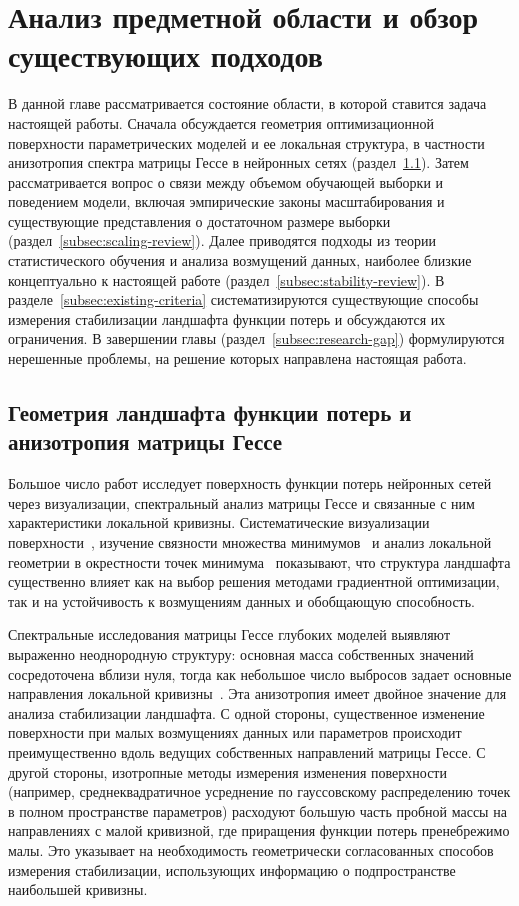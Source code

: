 \section{Анализ предметной области и обзор существующих подходов}\label{sec1}

В данной главе рассматривается состояние области, в которой ставится задача настоящей работы. Сначала обсуждается геометрия оптимизационной поверхности параметрических моделей и ее локальная структура, в частности анизотропия спектра матрицы Гессе в нейронных сетях (раздел~\ref{subsec:landscape-review}). Затем рассматривается вопрос о связи между объемом обучающей выборки и поведением модели, включая эмпирические законы масштабирования и существующие представления о достаточном размере выборки (раздел~\ref{subsec:scaling-review}). Далее приводятся подходы из теории статистического обучения и анализа возмущений данных, наиболее близкие концептуально к настоящей работе (раздел~\ref{subsec:stability-review}). В разделе~\ref{subsec:existing-criteria} систематизируются существующие способы измерения стабилизации ландшафта функции потерь и обсуждаются их ограничения. В завершении главы (раздел~\ref{subsec:research-gap}) формулируются нерешенные проблемы, на решение которых направлена настоящая работа.

\subsection{Геометрия ландшафта функции потерь и анизотропия матрицы Гессе}\label{subsec:landscape-review}

Большое число работ исследует поверхность функции потерь нейронных сетей через визуализации, спектральный анализ матрицы Гессе и связанные с ним характеристики локальной кривизны. Систематические визуализации поверхности~\cite{li2018visualizing}, изучение связности множества минимумов~\cite{draxler2018essentially,garipov2018loss} и анализ локальной геометрии в окрестности точек минимума~\cite{fort2019large} показывают, что структура ландшафта существенно влияет как на выбор решения методами градиентной оптимизации, так и на устойчивость к возмущениям данных и обобщающую способность.

Спектральные исследования матрицы Гессе глубоких моделей выявляют выраженно неоднородную структуру: основная масса собственных значений сосредоточена вблизи нуля, тогда как небольшое число выбросов задает основные направления локальной кривизны~\cite{sagun2017hessian,ghorbani2019investigation,papyan2019measurements,papyan2020traces,singh2021analytic}. Эта анизотропия имеет двойное значение для анализа стабилизации ландшафта. С одной стороны, существенное изменение поверхности при малых возмущениях данных или параметров происходит преимущественно вдоль ведущих собственных направлений матрицы Гессе. С другой стороны, изотропные методы измерения изменения поверхности (например, среднеквадратичное усреднение по гауссовскому распределению точек в полном пространстве параметров) расходуют большую часть пробной массы на направлениях с малой кривизной, где приращения функции потерь пренебрежимо малы. Это указывает на необходимость геометрически согласованных способов измерения стабилизации, использующих информацию о подпространстве наибольшей кривизны.

